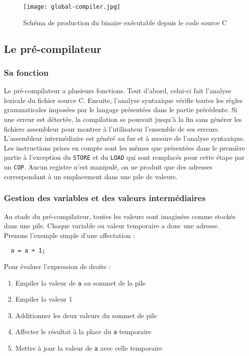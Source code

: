 \begin{figure}[!h]
    \centering
    \texttt{[image: global-compiler.jpg]}
    \caption{Schéma de production du binaire exécutable depuis le code source C}
    \label{schema-compilation}
\end{figure}

\subsection{Le pré-compilateur}

\subsubsection{Sa fonction}

Le pré-compilateur a plusieurs fonctions. Tout d’abord, celui-ci fait l’analyse lexicale du fichier source C. Ensuite, l’analyse syntaxique vérifie toutes les règles grammaticales imposées par le langage présentées dans le partie précédente. Si une erreur est détectée, la compilation se poursuit jusqu’à la fin sans générer les fichiers assembleur pour montrer à l’utilisateur l’ensemble de ses erreurs.\\
L’assembleur intermédiaire est généré au fur et à mesure de l’analyse syntaxique. Les instructions prises en compte sont les mêmes que présentées dans le première partie à l'exception du \texttt{STORE} et du \texttt{LOAD} qui sont remplacés pour cette étape par un \texttt{COP}. Aucun registre n’est manipulé, on ne produit que des adresses correspondant à un emplacement dans une pile de valeurs.

\subsubsection{Gestion des variables et des valeurs intermédiaires}

Au stade du pré-compilateur, toutes les valeurs sont imaginées comme stockés dans une pile. Chaque variable ou valeur temporaire a donc une adresse.\\

Prenons l’exemple simple d’une affectation :
\begin{verbatim}
  a = a + 1;
\end{verbatim}

Pour évaluer l’expression de droite :
\begin{enumerate}
\item{Empiler la valeur de \texttt{a} au sommet de la pile}

\item{Empiler la valeur 1}

\item{Additionner les deux valeurs du sommet de pile}

\item{Affecter le résultat à la place du \texttt{a} temporaire}

\item{Mettre à jour la valeur de \texttt{a} avec celle temporaire}
\end{enumerate}

